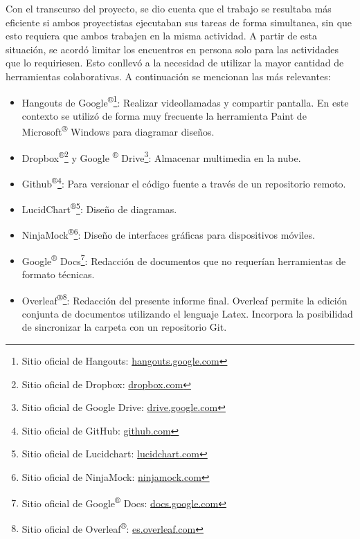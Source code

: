         \par Con el transcurso del proyecto, se dio cuenta que el trabajo se resultaba más eficiente si ambos proyectistas ejecutaban sus tareas de forma simultanea, sin que esto requiera que ambos trabajen en la misma actividad. A partir de esta situación, se acordó limitar los encuentros en persona solo para las actividades que lo requiriesen. Esto conllevó a la necesidad de utilizar la mayor cantidad de herramientas colaborativas. A continuación se mencionan las más relevantes:
        \begin{itemize}
            
            \item Hangouts de Google\textsuperscript{®}\footnote{ Sitio oficial de Hangouts: \url{hangouts.google.com}}: Realizar videollamadas y compartir pantalla. En este contexto se utilizó de forma muy frecuente la herramienta Paint de Microsoft\textsuperscript{®} Windows para diagramar diseños.
            
            \item Dropbox\textsuperscript{®}\footnote{ Sitio oficial de Dropbox: \url{dropbox.com}} y Google \textsuperscript{®} Drive\footnote{ Sitio oficial de Google Drive: \url{drive.google.com}}: Almacenar multimedia en la nube.
            
            \item Github\textsuperscript{®}\footnote{ Sitio oficial de GitHub: \url{github.com}}: Para versionar el código fuente a través de un repositorio remoto.
            
            \item LucidChart\textsuperscript{®}\footnote{ Sitio oficial de Lucidchart: \url{lucidchart.com}}: Diseño de diagramas.
            
            \item NinjaMock\textsuperscript{®}\footnote{ Sitio oficial de NinjaMock: \url{ninjamock.com}}: Diseño de interfaces gráficas para dispositivos móviles.
            
            \item Google\textsuperscript{®} Docs\footnote{ Sitio oficial de Google\textsuperscript{®} Docs: \url{docs.google.com}}: Redacción de documentos que no requerían herramientas de formato técnicas.
            
            \item Overleaf\textsuperscript{®}\footnote{ Sitio oficial de Overleaf\textsuperscript{®}: \url{es.overleaf.com}}: Redacción del presente informe final. Overleaf permite la edición conjunta de documentos utilizando el lenguaje Latex. Incorpora la posibilidad de sincronizar la carpeta con un repositorio Git.
            
        \end{itemize}
        
